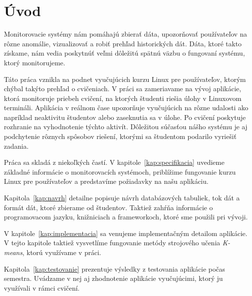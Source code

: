 \chapter*{Úvod} %

Monitorovacie systémy nám pomáhajú zbierať dáta, upozorňovať používateľov na rôzne
anomálie, vizualizovať a robiť prehľad historických dát. Dáta, ktoré takto získame, nám
vedia poskytnúť veľmi dôležitú spätnú väzbu o fungovaní systému, ktorý monitorujeme.

Táto práca vznikla na podnet vyučujúcich kurzu Linux pre používateľov, ktorým chýbal
takýto prehľad o cvičeniach. V práci sa zameriavame na vývoj aplikácie, ktorá
monitoruje priebeh cvičení, na ktorých študenti riešia úlohy v Linuxovom termináli.
Aplikácia v reálnom čase upozorňuje vyučujúcich na rôzne udalosti
ako napríklad neaktivitu študentov alebo zaseknutia sa v úlohe.
Po cvičení poskytuje rozhranie na vyhodnotenie týchto aktivít. Dôležitou súčasťou
nášho systému je aj podchytenie rôznych spôsobov riešení, ktorými  sa študentom
podarilo vyriešiť zadania.

Práca sa skladá z niekoľkých častí. V kapitole~\ref{kap:specifikacia} uvedieme základné
informácie o monitorovacích systémoch, priblížime fungovanie kurzu Linux pre používateľov
a predstavíme požiadavky na našu aplikáciu.

Kapitola~\ref{kap:navrh} detailne popisuje návrh databázových tabuliek, tok dát a
formát dát, ktoré zbierame od študentov. Taktiež zahŕňa informácie o programovacom jazyku,
knižniciach a frameworkoch, ktoré sme použili pri vývoji.

V kapitole~\ref{kap:implementacia} sa venujeme implementačným detailom aplikácie. V tejto
kapitole taktiež vysvetlíme fungovanie metódy strojového učenia \textit{K-means}, ktorú
využívame v práci.

Kapitola~\ref{kap:testovanie} prezentuje výsledky z testovania aplikácie počas semestra.
Uvádzame v nej aj zhodnotenie aplikácie vyučujúcimi, ktorý ju využívali v rámci cvičení.